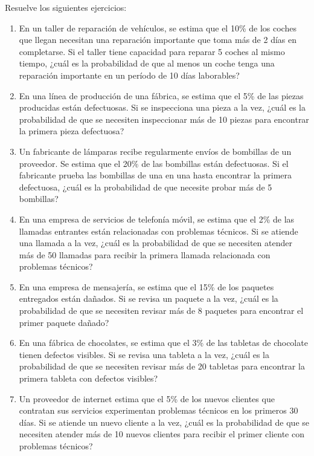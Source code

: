 \begin{Ejer}
Resuelve los siguientes ejercicios:
\begin{enumerate}

    \item En un taller de reparación de vehículos, se estima que el 10\% de los coches que llegan necesitan una reparación importante que toma más de 2 días en completarse. Si el taller tiene capacidad para reparar 5 coches al mismo tiempo, ¿cuál es la probabilidad de que al menos un coche tenga una reparación importante en un período de 10 días laborables?

    \item En una línea de producción de una fábrica, se estima que el 5\% de las piezas producidas están defectuosas. Si se inspecciona una pieza a la vez, ¿cuál es la probabilidad de que se necesiten inspeccionar más de 10 piezas para encontrar la primera pieza defectuosa?

    \item Un fabricante de lámparas recibe regularmente envíos de bombillas de un proveedor. Se estima que el 20\% de las bombillas están defectuosas. Si el fabricante prueba las bombillas de una en una hasta encontrar la primera defectuosa, ¿cuál es la probabilidad de que necesite probar más de 5 bombillas?

    \item En una empresa de servicios de telefonía móvil, se estima que el 2\% de las llamadas entrantes están relacionadas con problemas técnicos. Si se atiende una llamada a la vez, ¿cuál es la probabilidad de que se necesiten atender más de 50 llamadas para recibir la primera llamada relacionada con problemas técnicos?

    \item En una empresa de mensajería, se estima que el 15\% de los paquetes entregados están da\~nados. Si se revisa un paquete a la vez, ¿cuál es la probabilidad de que se necesiten revisar más de 8 paquetes para encontrar el primer paquete da\~nado?

    \item En una fábrica de chocolates, se estima que el 3\% de las tabletas de chocolate tienen defectos visibles. Si se revisa una tableta a la vez, ¿cuál es la probabilidad de que se necesiten revisar más de 20 tabletas para encontrar la primera tableta con defectos visibles?

    \item Un proveedor de internet estima que el 5\% de los nuevos clientes que contratan sus servicios experimentan problemas técnicos en los primeros 30 días. Si se atiende un nuevo cliente a la vez, ¿cuál es la probabilidad de que se necesiten atender más de 10 nuevos clientes para recibir el primer cliente con problemas técnicos?


\end{enumerate}
\end{Ejer}
